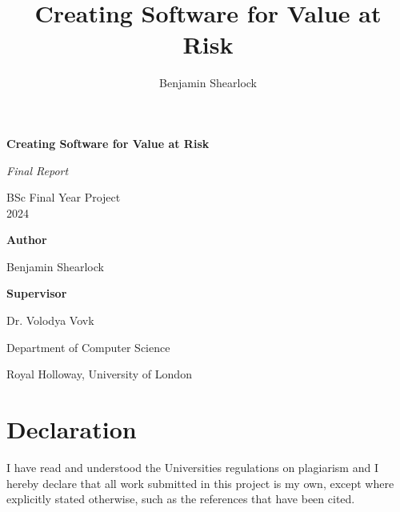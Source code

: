 \documentclass{article}
\title{Creating Software for Value at Risk}
\author{Benjamin Shearlock}
\begin{document}
\raggedright

\begin{titlepage}
  \begin{center}
    \vspace*{1cm}
    {\LARGE \textbf{Creating Software for Value at Risk} \par} 
    \vspace{1.5cm}
    {\Large \textit{Final Report} \par}
    \vspace{0.5cm}
    {\Large BSc Final Year Project \\ 2024 \par}
    \vspace{2cm}
    {\large \textbf{Author} \par}
    {\large Benjamin Shearlock \par}
    \vspace{2cm}
    {\large \textbf{Supervisor} \par}
    {\large Dr. Volodya Vovk \par}
    \vfill
    {\large Department of Computer Science \par}
    {\large Royal Holloway, University of London \par}
  \end{center}
\end{titlepage}

\setlength{\parindent}{0pt}

\section*{Declaration}
I have read and understood the Universities regulations on plagiarism and I hereby declare that all work submitted in this project is my own, except where explicitly stated otherwise, such as the references that have been cited. \\
\end{document}
